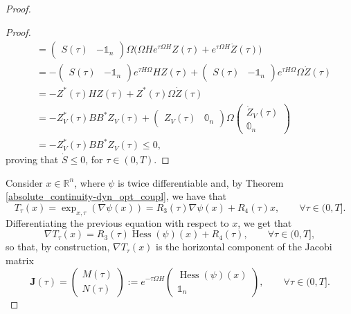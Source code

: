 \documentclass[reqno]{amsart}
\DeclareMathOperator{\Hess}{Hess}
\theoremstyle{plain}
\theoremstyle{definition}
\theoremstyle{remark}
\begin{document}
\begin{proof}
\begin{proof}
\begin{align}
			&=\begin{pmatrix}
				S(\tau) & -\mathbb{1}_n
			\end{pmatrix}\Omega\bigg(\Omega He^{\tau\Omega H}Z(\tau)+e^{\tau\Omega H}\dot{Z}(\tau)\bigg)\\
			&=-\begin{pmatrix}
				S(\tau) & -\mathbb{1}_n
			\end{pmatrix}e^{\tau H\Omega}HZ(\tau)+\begin{pmatrix}
				S(\tau) & -\mathbb{1}_n
			\end{pmatrix}e^{\tau H\Omega}\Omega\dot{Z}(\tau)\\
			&=-Z^*(\tau)HZ(\tau)+Z^*(\tau)\Omega\dot{Z}(\tau)\\
			&=-Z_V^*(\tau)BB^*Z_V(\tau)+\begin{pmatrix}
				Z_V(\tau) & \mathbb{0}_n
			\end{pmatrix}\Omega\begin{pmatrix}
				\dot{Z}_V(\tau)\\
				\mathbb{0}_n
			\end{pmatrix}\\
			&=-Z_V^*(\tau)BB^*Z_V(\tau)\leq 0,
		\end{align}
		proving that $\dot{S}\leq 0$, for $\tau\in(0,T)$.
		\end{proof}
		Consider $x\in\mathbb{R}^n$, where $\psi$ is twice differentiable and, by Theorem \ref{absolute_continuity-dyn_opt_coupl}, we have that 
		\begin{equation}
			T_\tau(x)=\exp_{x,\tau}(\nabla\psi(x))=R_3(\tau)\nabla\psi(x)+R_4(\tau)x,\qquad\forall \tau\in(0,T].
		\end{equation}
		Differentiating the previous equation with respect to $x$, we get that
		\begin{equation}
			\nabla T_\tau(x)=R_3(\tau)\Hess(\psi)(x)+R_4(\tau),\qquad\forall \tau\in(0,T],
		\end{equation}
		so that, by construction, $\nabla T_\tau(x)$ is the horizontal component of the Jacobi matrix
		\begin{equation}\label{def_Jacobi_Hessian}
			\mathbf{J}(\tau)=\begin{pmatrix}
				M(\tau)\\
				N(\tau)
			\end{pmatrix}:=e^{-\tau\Omega H}\begin{pmatrix}
				\Hess(\psi)(x)\\
				\mathbb{1}_n
			\end{pmatrix},\qquad\forall \tau\in(0,T].

\end{equation}
\end{proof}
\end{document}
